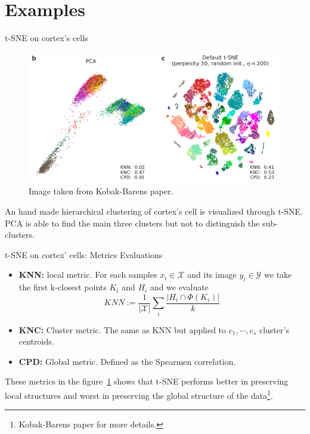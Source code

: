\documentclass[10pt]{beamer}
\theoremstyle{definition}
\newcommand{\1}{\mathbbm{1}}
\newcommand{\XX}{\mathcal{X}}
\newcommand{\YY}{\mathcal{Y}}
\begin{document}
\section{Examples}
\begin{frame}{t-SNE on cortex's cells}
  \begin{figure}[h!]
    \centering
    \includegraphics[scale=0.27]{./pic/cells.png}
    \caption{Image taken from Kobak-Barens paper.}
    \label{cortex}
  \end{figure}
  An hand made hierarchical clustering of cortex's cell is visualized
  through t-SNE\@. PCA is able to find the main three clusters but not to
  distinguish the sub-clusters.
\end{frame}
\begin{frame}{t-SNE on cortex' cells: Metrics Evaluations}
  \begin{itemize}
    \item {\bf KNN:} local metric. For each samples $x_i\in\XX$ and its
      image $y_i\in\YY$ we take the first k-closest points $K_i$ and $H_i$
      and we evaluate
      \[
        KNN := \frac{1}{|\XX|}\sum_i \frac{|H_i\cap \Phi(K_i)|}{k}
      \]
    \item {\bf KNC:} Cluster metric. The same as KNN but applied to
      $c_1,\cdots,c_s$ cluster's centroids.
    \item {\bf CPD:} Global metric. Defined as the Spearmen
      correlation.
  \end{itemize}
  These metrics in the figure~\ref{cortex} shows that t-SNE performs
  better in preserving local structures and worst in preserving the global
  structure of the data\footnote{Kobak-Barens paper for more details.}.
\end{frame}
\end{document}

